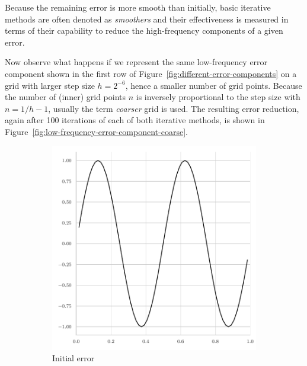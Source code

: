 Because the remaining error is more smooth than initially, basic iterative methods are often denoted as \emph{smoothers} and their effectiveness is measured in terms of their capability to reduce the high-frequency components of a given error. 

Now observe what happens if we represent the same low-frequency error component shown in the first row of Figure~\ref{fig:different-error-components} on a grid with larger step size $h = 2^{-6}$, hence a smaller number of grid points.
Because the number of (inner) grid points $n$ is inversely proportional to the step size with $n = 1/h - 1$, usually the term \emph{coarser} grid is used.
The resulting error reduction, again after 100 iterations of each of both iterative methods, is shown in Figure~\ref{fig:low-frequency-error-component-coarse}. 
\begin{figure}
	\begin{subfigure}[b]{0.32\textwidth}
	\centering
	\includegraphics[width=\textwidth]{figures/error_plots//initial_error_jacobi_4pi_coarse.pdf}
	\caption{Initial error}
\end{subfigure}
\hfill
\begin{subfigure}[b]{0.32\textwidth}
	\centering

\end{subfigure}
\end{figure}
